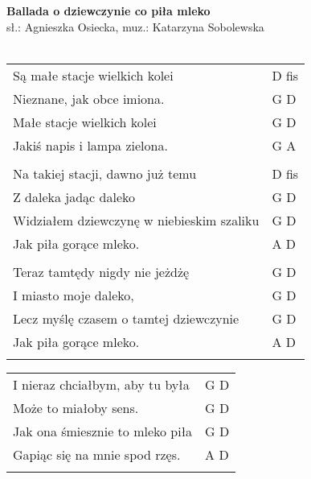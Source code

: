 \documentclass[a5paper]{article}
\begin{document}


\noindent
\fontsize{12pt}{15pt}\selectfont
\textbf{Ballada o dziewczynie co piła mleko} \\
\fontsize{8pt}{10pt}\selectfont
sł.: Agnieszka Osiecka, muz.: Katarzyna Sobolewska\\ \\
\fontsize{10pt}{12pt}\selectfont
{}
\begin{tabular}{@{}p{8.5cm}p{3cm}@{}}
\noindent
Są małe stacje wielkich kolei & D fis \\
Nieznane, jak obce imiona. & G D \\
Małe stacje wielkich kolei & G D \\
Jakiś napis i lampa zielona. & G A \\ \\

Na takiej stacji, dawno już temu & D fis \\
Z daleka jadąc daleko & G D \\
Widziałem dziewczynę w niebieskim szaliku & G D \\
Jak piła gorące mleko. & A D \\ \\

Teraz tamtędy nigdy nie jeżdżę & G D \\
I miasto moje daleko, & G D \\
Lecz myślę czasem o tamtej dziewczynie & G D \\
Jak piła gorące mleko. & A D \\ \\
\end{tabular}

\noindent
\begin{tabular}{@{}p{7.5cm}p{3cm}@{}}
I nieraz chciałbym, aby tu była & G D \\
Może to miałoby sens. & G D \\
Jak ona śmiesznie to mleko piła & G D \\
Gapiąc się na mnie spod rzęs. & A D \\ \\
\end{tabular}
\end{document}
